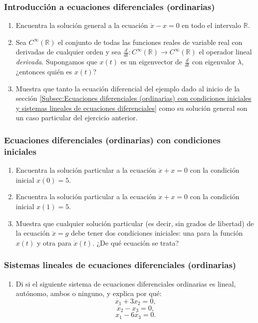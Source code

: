 \documentclass[12pt,dvipsnames]{article}
\begin{document}
\subsubsection{Introducción a ecuaciones diferenciales (ordinarias)}
\begin{enumerate}
    \item Encuentra la solución general a la ecuación $\dot{x}-x=0$ en todo el intervalo $\mathbb{R}$.
    \item Sea $C^{\infty}(\mathbb{R})$ el conjunto de todas las funciones reales de variable real con derivadas de cualquier orden y sea $\frac{d}{dt}:C^{\infty}(\mathbb{R})\to C^{\infty}(\mathbb{R})$ el operador lineal \emph{derivada}. Supongamos que $x(t)$ es un eigenvector de $\frac{d}{dt}$ con eigenvalor $\lambda,$ ¿entonces quién es $x(t)$?
    \item Muestra que tanto la ecuación diferencial del ejemplo dado al inicio de la sección \ref{Subsec:Ecuaciones diferenciales (ordinarias) con condiciones iniciales y sistemas lineales de ecuaciones diferenciales} como su solución general son un caso particular del ejercicio anterior.
\end{enumerate}

\subsubsection{Ecuaciones diferenciales (ordinarias) con condiciones iniciales}
\begin{enumerate}
    \item Encuentra la solución particular a la ecuación $\dot{x}+x=0$ con la condición inicial $x(0)=5$.
    \item Encuentra la solución particular a la ecuación $\dot{x}+x=0$ con la condición inicial $x(1)=5$.
    \item Muestra que cualquier solución particular (es decir, sin grados de libertad) de la ecuación $\ddot{x}=g$ debe tener dos condiciones iniciales: una para la función $x(t)$ y otra para $\dot{x}(t)$. ¿De qué ecuación se trata?
\end{enumerate}

\subsubsection{Sistemas lineales de ecuaciones diferenciales (ordinarias)}
\begin{enumerate}
    \item Di si el siguiente sistema de ecuaciones diferenciales ordinarias es lineal, autónomo, ambos o ninguno, y explica por qué: $$\dot{x_1}+3x_2 = 0,$$ $$\dot{x_2} - x_3 = 0,$$ $$x_1-6\dot{x_3} = 0.$$
\end{enumerate}
\end{document}
